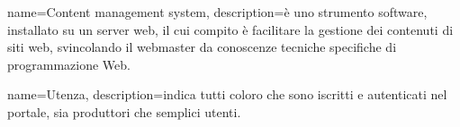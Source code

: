 {
    name={Content management system},
    description={è uno strumento software, installato su un server web, il cui
        compito è facilitare la gestione dei contenuti di siti web, svincolando il
        webmaster da conoscenze tecniche specifiche di programmazione Web.}
}

{
    name={Utenza},
    description={indica tutti coloro che sono iscritti e autenticati nel portale, sia produttori che semplici utenti.}
}



